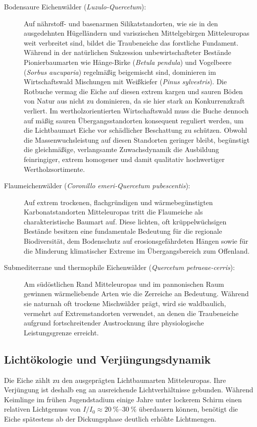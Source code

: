 \documentclass[twocolumn, bibliography=totoc, abstract=true]{scrartcl}
\begin{document}
\begin{description}
\item[Bodensaure Eichenwälder (\textit{Luzulo-Quercetum}):] Auf nährstoff- und basenarmen Silikatstandorten, wie sie in den ausgedehnten Hügelländern und variszischen Mittelgebirgen Mitteleuropas weit verbreitet sind, bildet die Traubeneiche das forstliche Fundament. Während in der natürlichen Sukzession unbewirtschafteter Bestände Pionierbaumarten wie Hänge-Birke (\textit{Betula pendula}) und Vogelbeere (\textit{Sorbus aucuparia}) regelmäßig beigemischt sind, dominieren im Wirtschaftswald Mischungen mit Weißkiefer (\textit{Pinus sylvestris}). Die Rotbuche vermag die Eiche auf diesen extrem kargen und sauren Böden von Natur aus nicht zu dominieren, da sie hier stark an Konkurrenzkraft verliert. Im wertholzorientierten Wirtschaftswald muss die Buche dennoch auf mäßig sauren Übergangsstandorten konsequent reguliert werden, um die Lichtbaumart Eiche vor schädlicher Beschattung zu schützen. Obwohl die Massenwuchsleistung auf diesen Standorten geringer bleibt, begünstigt die gleichmäßige, verlangsamte Zuwachsdynamik die Ausbildung feinringiger, extrem homogener und damit qualitativ hochwertiger Wertholzsortimente.
\item[Flaumeichenwälder (\textit{Coronillo emeri-Quercetum pubescentis}):] Auf extrem trockenen, flachgründigen und wärmebegünstigten Karbonatstandorten Mitteleuropas tritt die Flaumeiche als charakteristische Baumart auf. Diese lichten, oft krüppelwüchsigen Bestände besitzen eine fundamentale Bedeutung für die regionale Biodiversität, dem Bodenschutz auf erosionsgefährdeten Hängen sowie für die Minderung klimatischer Extreme im Übergangsbereich zum Offenland.
\item[Submediterrane und thermophile Eichenwälder (\textit{Quercetum petraeae-cerris}):] Am südöstlichen Rand Mitteleuropas und im pannonischen Raum gewinnen wärmeliebende Arten wie die Zerreiche an Bedeutung. Während sie naturnah oft trockene Mischwälder prägt, wird sie waldbaulich, vermehrt auf Extremstandorten verwendet, an denen die Traubeneiche aufgrund fortschreitender Austrocknung ihre physiologische Leistungsgrenze erreicht.
\end{description}

\subsection{Lichtökologie und Verjüngungsdynamik}

Die Eiche zählt zu den ausgeprägten Lichtbaumarten Mitteleuropas. Ihre Verjüngung ist deshalb eng an ausreichende Lichtverhältnisse gebunden. Während Keimlinge im frühen Jugendstadium einige Jahre unter lockerem Schirm einen relativen Lichtgenuss von $I/I_0 \approx \qtyrange{20}{30}{\%}$ überdauern können, benötigt die Eiche spätestens ab der Dickungsphase deutlich erhöhte Lichtmengen.
\end{document}
